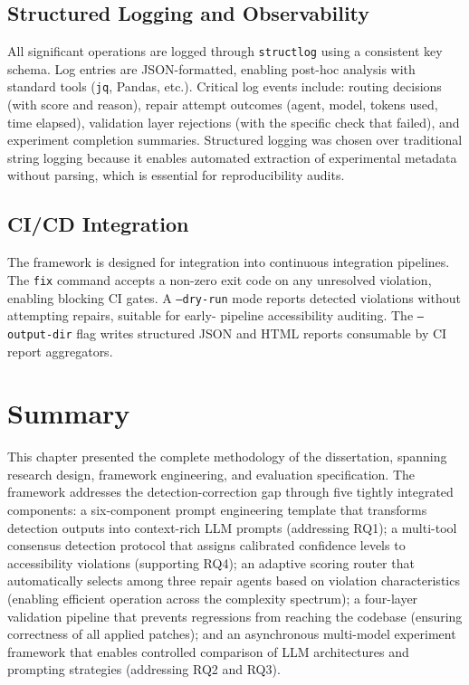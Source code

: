 \subsection{Structured Logging and Observability}

All significant operations are logged through \texttt{structlog} using a
consistent key schema.  Log entries are JSON-formatted, enabling post-hoc
analysis with standard tools (\texttt{jq}, Pandas, etc.).  Critical log
events include: routing decisions (with score and reason), repair attempt
outcomes (agent, model, tokens used, time elapsed), validation layer
rejections (with the specific check that failed), and experiment completion
summaries.  Structured logging was chosen over traditional string logging
because it enables automated extraction of experimental metadata without
parsing, which is essential for reproducibility audits.

\subsection{CI/CD Integration}

The framework is designed for integration into continuous integration
pipelines.  The \texttt{fix} command accepts a non-zero exit code on any
unresolved violation, enabling blocking CI gates.  A \texttt{--dry-run} mode
reports detected violations without attempting repairs, suitable for early-
pipeline accessibility auditing.  The \texttt{--output-dir} flag writes
structured JSON and HTML reports consumable by CI report aggregators.

\section{Summary}
\label{sec:methodology_summary}

This chapter presented the complete methodology of the dissertation, spanning
research design, framework engineering, and evaluation specification.  The
framework addresses the detection-correction gap through five tightly
integrated components: a six-component prompt engineering template that
transforms detection outputs into context-rich LLM prompts (addressing RQ1);
a multi-tool consensus detection protocol that assigns calibrated confidence
levels to accessibility violations (supporting RQ4); an adaptive scoring
router that automatically selects among three repair agents based on violation
characteristics (enabling efficient operation across the complexity spectrum);
a four-layer validation pipeline that prevents regressions from reaching the
codebase (ensuring correctness of all applied patches); and an asynchronous
multi-model experiment framework that enables controlled comparison of LLM
architectures and prompting strategies (addressing RQ2 and RQ3).

